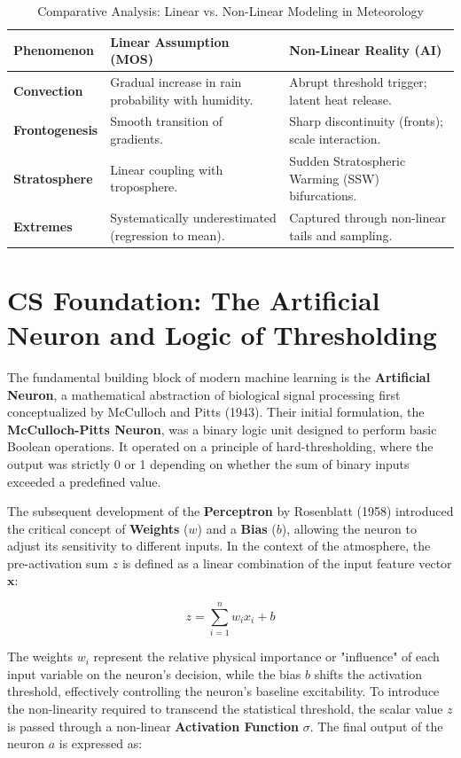 \begin{table}[H]
\centering
\caption{Comparative Analysis: Linear vs. Non-Linear Modeling in Meteorology}
\begin{tabular}{|l|p{5cm}|p{5cm}|}
\hline
\textbf{Phenomenon} & \textbf{Linear Assumption (MOS)} & \textbf{Non-Linear Reality (AI)} \\ \hline
\textbf{Convection} & Gradual increase in rain probability with humidity. & Abrupt threshold trigger; latent heat release. \\ \hline
\textbf{Frontogenesis} & Smooth transition of gradients. & Sharp discontinuity (fronts); scale interaction. \\ \hline
\textbf{Stratosphere} & Linear coupling with troposphere. & Sudden Stratospheric Warming (SSW) bifurcations. \\ \hline
\textbf{Extremes} & Systematically underestimated (regression to mean). & Captured through non-linear tails and sampling. \\ \hline
\end{tabular}
\end{table}

\section{CS Foundation: The Artificial Neuron and Logic of Thresholding}

The fundamental building block of modern machine learning is the \textbf{Artificial Neuron}, a mathematical abstraction of biological signal processing first conceptualized by McCulloch and Pitts (1943). Their initial formulation, the \textbf{McCulloch-Pitts Neuron}, was a binary logic unit designed to perform basic Boolean operations. It operated on a principle of hard-thresholding, where the output was strictly 0 or 1 depending on whether the sum of binary inputs exceeded a predefined value. 

The subsequent development of the \textbf{Perceptron} by Rosenblatt (1958) introduced the critical concept of \textbf{Weights} ($w$) and a \textbf{Bias} ($b$), allowing the neuron to adjust its sensitivity to different inputs. In the context of the atmosphere, the pre-activation sum $z$ is defined as a linear combination of the input feature vector $\mathbf{x}$:

\begin{equation}
z = \sum_{i=1}^{n} w_i x_i + b
\end{equation}

The weights $w_i$ represent the relative physical importance or "influence" of each input variable on the neuron's decision, while the bias $b$ shifts the activation threshold, effectively controlling the neuron's baseline excitability. To introduce the non-linearity required to transcend the statistical threshold, the scalar value $z$ is passed through a non-linear \textbf{Activation Function} $\sigma$. The final output of the neuron $a$ is expressed as:

